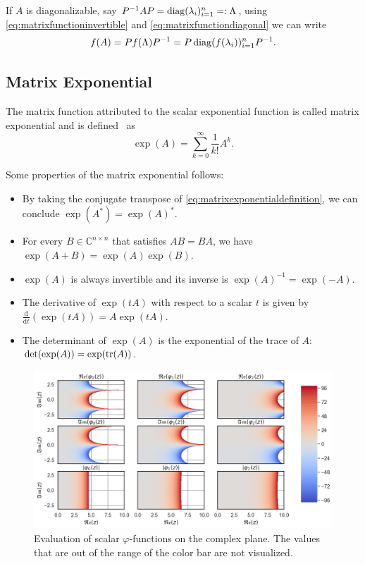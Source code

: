 If $A$ is diagonalizable, say $P^{-1}AP = \operatorname{diag}(\lambda_i)_{i=1}^{n} =: \Lambda$,
using \eqref{eq:matrixfunctioninvertible} and \eqref{eq:matrixfunctiondiagonal}
we can write
\begin{equation}
    f(A) = P f(\Lambda) P^{-1} = P \operatorname{diag}(f(\lambda_i))_{i=1}^{n} P^{-1}.
\end{equation}

\subsection{Matrix Exponential}
The matrix function attributed to the scalar exponential function is called
matrix exponential and is defined~\cite{higham2008functions} as
\begin{equation}
    \label{eq:matrixexponentialdefinition}
    \exp(A) = \sum_{k=0}^{\infty}{\frac{1}{k!} A^k}.
\end{equation}

Some properties of the matrix exponential follows:
\begin{itemize}
    \item By taking the conjugate transpose of \eqref{eq:matrixexponentialdefinition},
        we can conclude $\exp(A^{*}) = \exp(A)^{*}$.
    \item For every $B \in \mathbb{C}^{n \times n}$ that satisfies $AB = BA$,
        we have $\exp(A + B) = \exp(A) \exp(B)$.
    \item $\exp(A)$ is always invertible and its inverse is $\exp(A)^{-1} = \exp(-A)$.
    \item The derivative of $\exp(tA)$ with respect to a scalar $t$ is given by
        $\frac{\mathrm{d}}{\mathrm{d} t} (\exp(tA)) = A \exp(tA)$.
    \item The determinant of $\exp(A)$ is the exponential of the trace of
        $A$: $\det(\exp(A)) = \exp(\trace(A))$.
\end{itemize}

\begin{figure}[h]
    \centering
    \includegraphics[width=.7\textwidth]{img/scalarcomplexplane.png}
    \caption{Evaluation of scalar $\varphi$-functions on the complex plane. The values that are out of the range of the color bar are not visualized.}
    \label{fig:scalarphifunctionscomplexplane}
\end{figure}


